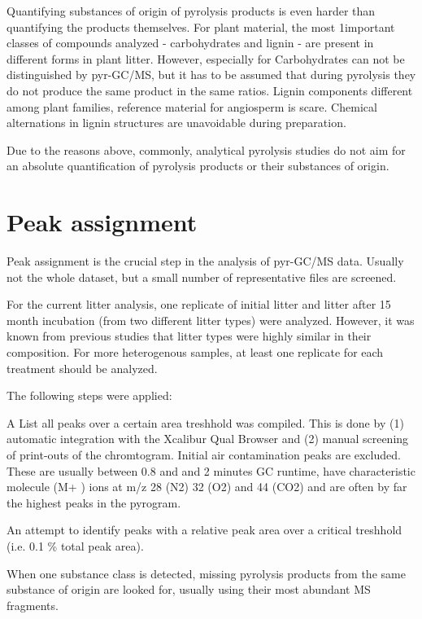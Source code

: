 Quantifying substances of origin of pyrolysis products is even harder than quantifying the products themselves. For plant material, the most 1important classes of compounds analyzed - carbohydrates and lignin - are present in different forms in plant litter. However, especially for Carbohydrates can not be distinguished by pyr-GC/MS, but it has to be assumed that during pyrolysis they do not produce the same product in the same ratios. Lignin components different among plant families, reference material for angiosperm is scare. Chemical alternations in lignin structures are unavoidable during preparation.


Due to the reasons above, commonly, analytical pyrolysis studies do not aim for an absolute quantification of pyrolysis products or their substances of origin. 



\section{Peak assignment}

Peak assignment is the crucial step in the analysis of pyr-GC/MS data. Usually not the whole dataset, but a small number of representative files are screened. 

For the current litter analysis, one replicate of initial litter and litter after 15 month incubation (from two different litter types) were analyzed. However, it was known from previous studies that litter types were highly similar in their composition. For more heterogenous samples, at least one replicate for each treatment should be analyzed. 

The following steps were applied:

A List all peaks over a certain area treshhold was compiled. This is done by (1) automatic integration with the Xcalibur Qual Browser and (2) manual screening of print-outs of the chromtogram. Initial air contamination peaks are excluded. These are usually between 0.8 and and 2 minutes GC runtime, have characteristic molecule (M+ ) ions at m/z 28 (N2) 32 (O2) and 44 (CO2) and are often by far the highest peaks in the pyrogram. 

An attempt to identify peaks with a relative peak area over a critical treshhold (i.e. 0.1 \% total peak area).

When one substance class is detected, missing pyrolysis products from the same substance of origin are looked for, usually using their most abundant MS fragments.

